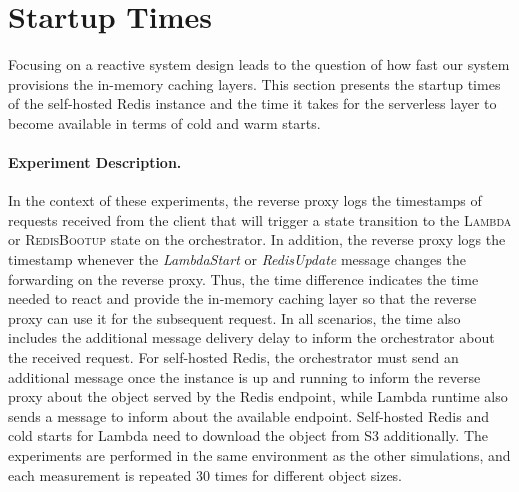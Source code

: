 

\section{Startup Times}
\label{subsec:startup_times}
Focusing on a reactive system design leads to the question of how fast our system provisions the in-memory caching layers. This section presents the startup times of the self-hosted Redis instance and the time it takes for the serverless layer to become available in terms of cold and warm starts. 

\paragraph{Experiment Description.}
In the context of these experiments, the reverse proxy logs the time\-stamps of requests received from the client that will trigger a state transition to the \textsc{Lambda} or \textsc{RedisBootup} state on the orchestrator. In addition, the reverse proxy logs the timestamp whenever the \emph{LambdaStart} or \emph{RedisUpdate} message changes the forwarding on the reverse proxy. Thus, the time difference indicates the time needed to react and provide the in-memory caching layer so that the reverse proxy can use it for the subsequent request. In all scenarios, the time also includes the additional message delivery delay to inform the orchestrator about the received request. For self-hosted Redis, the orchestrator must send an additional message once the instance is up and running to inform the reverse proxy about the object served by the Redis endpoint, while Lambda runtime also sends a message to inform about the available endpoint. Self-hosted Redis and cold starts for Lambda need to download the object from S3 additionally. The experiments are performed in the same environment as the other simulations, and each measurement is repeated 30 times for different object sizes.

